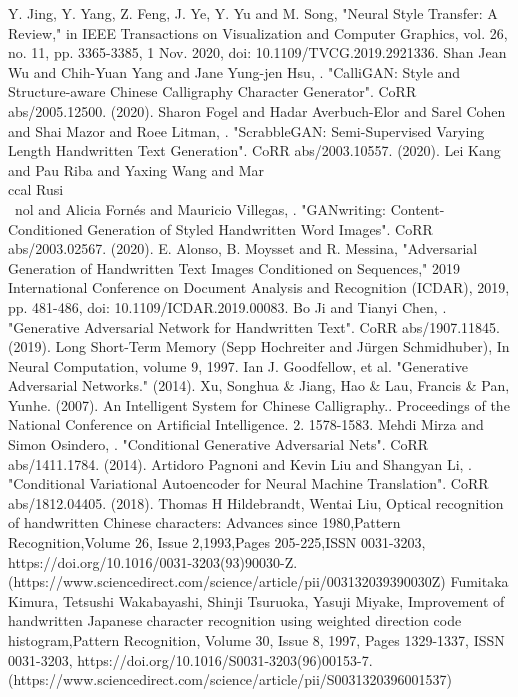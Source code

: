 \documentclass[12pt]{report}
\begin{document}
\begin{thebibliography}{9}
	Y. Jing, Y. Yang, Z. Feng, J. Ye, Y. Yu and M. Song, "Neural Style Transfer: A Review," in IEEE Transactions on Visualization and Computer Graphics, vol. 26, no. 11, pp. 3365-3385, 1 Nov. 2020, doi: 10.1109/TVCG.2019.2921336.
	 Shan Jean Wu and Chih-Yuan Yang and Jane Yung-jen Hsu, . "CalliGAN: Style and Structure-aware Chinese Calligraphy Character Generator". CoRR abs/2005.12500. (2020).
	 Sharon Fogel and Hadar Averbuch-Elor and Sarel Cohen and Shai Mazor and Roee Litman, . "ScrabbleGAN: Semi-Supervised Varying Length Handwritten Text Generation". CoRR abs/2003.10557. (2020).
	Lei Kang and Pau Riba and Yaxing Wang and Mar\\ccal Rusi\\~nol and Alicia Fornés and Mauricio Villegas, . "GANwriting: Content-Conditioned Generation of Styled Handwritten Word Images". CoRR abs/2003.02567. (2020).
	 E. Alonso, B. Moysset and R. Messina, "Adversarial Generation of Handwritten Text Images Conditioned on Sequences," 2019 International Conference on Document Analysis and Recognition (ICDAR), 2019, pp. 481-486, doi: 10.1109/ICDAR.2019.00083.
	 Bo Ji and Tianyi Chen, . "Generative Adversarial Network for Handwritten Text". CoRR abs/1907.11845. (2019).
	 Long Short-Term Memory (Sepp Hochreiter and Jürgen Schmidhuber), In Neural Computation, volume 9, 1997.
	 Ian J. Goodfellow, et al. "Generative Adversarial Networks." (2014). 
	Xu, Songhua \& Jiang, Hao \& Lau, Francis \& Pan, Yunhe. (2007). An Intelligent System for Chinese Calligraphy.. Proceedings of the National Conference on Artificial Intelligence. 2. 1578-1583. 
	Mehdi Mirza and Simon Osindero, . "Conditional Generative Adversarial Nets". CoRR abs/1411.1784. (2014).
	Artidoro Pagnoni and Kevin Liu and Shangyan Li, . "Conditional Variational Autoencoder for Neural Machine Translation". CoRR abs/1812.04405. (2018).
	 Thomas H Hildebrandt, Wentai Liu, Optical recognition of handwritten Chinese characters: Advances since 1980,Pattern Recognition,Volume 26, Issue 2,1993,Pages 205-225,ISSN 0031-3203, https://doi.org/10.1016/0031-3203(93)90030-Z.
(https://www.sciencedirect.com/science/article/pii/003132039390030Z)
	 Fumitaka Kimura, Tetsushi Wakabayashi, Shinji Tsuruoka, Yasuji Miyake, Improvement of handwritten Japanese character recognition using weighted direction code histogram,Pattern Recognition, Volume 30, Issue 8, 1997, Pages 1329-1337, ISSN 0031-3203, https://doi.org/10.1016/S0031-3203(96)00153-7. (https://www.sciencedirect.com/science/article/pii/S0031320396001537)

\end{thebibliography}
\end{document}

